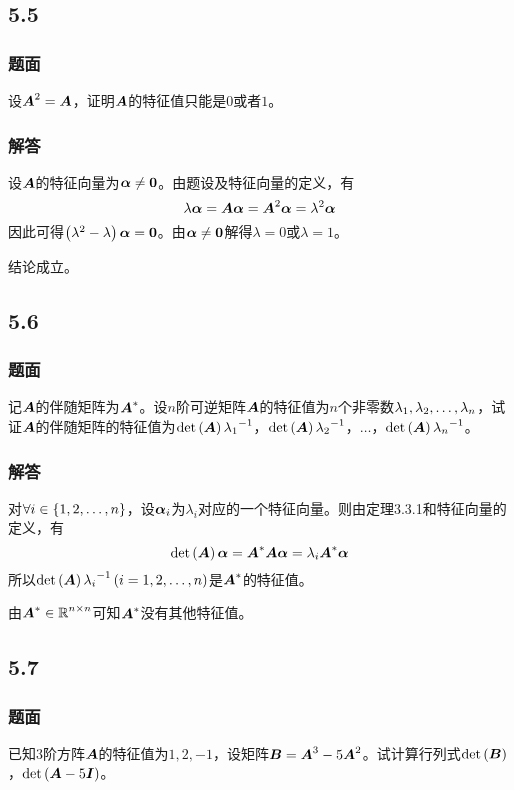 \documentclass[9pt,xcolor=svgnames]{beamer} %
\begin{document}
\subsection*{5.5}
\begin{frame}
    \frametitle{题面}
    设\(\boldsymbol{A}^2=\boldsymbol{A}\)，证明\(\boldsymbol{A}\)的特征值只能是\(0\)或者\(1\)。
\end{frame}

\begin{frame}
    \frametitle{解答}
    设\(\boldsymbol{A}\)的特征向量为\(\boldsymbol{\alpha}\neq\boldsymbol{0}\)。由题设及特征向量的定义，有
    \begin{equation*}
        \lambda\boldsymbol{\alpha}=\boldsymbol{A}\boldsymbol{\alpha}=\boldsymbol{A}^2\boldsymbol{\alpha}=\lambda^2\boldsymbol{\alpha}
    \end{equation*}
    \pause
    因此可得\(\left( \lambda^2-\lambda \right)\boldsymbol{\alpha}=\boldsymbol{0}\)。由\(\boldsymbol{\alpha}\neq\boldsymbol{0}\)解得\(\lambda=0\)或\(\lambda=1\)。

    结论成立。
\end{frame}

\subsection*{5.6}
\begin{frame}
    \frametitle{题面}
    记\(\boldsymbol{A}\)的伴随矩阵为\(\boldsymbol{A}^*\)。设\(n\)阶可逆矩阵\(\boldsymbol{A}\)的特征值为\(n\)个非零数\({\lambda}_1,{\lambda}_2,\dots,{\lambda}_{n}\)，试证\(\boldsymbol{A}\)的伴随矩阵的特征值为\(\mathrm{det}\left( \boldsymbol{A} \right){\lambda_1}^{-1}\)，\(\mathrm{det}\left( \boldsymbol{A} \right){\lambda_2}^{-1}\)，\(\dots\)，\(\mathrm{det}\left( \boldsymbol{A} \right){\lambda_n}^{-1}\)。
\end{frame}

\begin{frame}
    \frametitle{解答}
    对\(\forall i\in\left\{1,2,\dots,n \right\}\)，设\(\boldsymbol{\alpha}_i\)为\(\lambda_i\)对应的一个特征向量。则由定理3.3.1和特征向量的定义，有
    \begin{equation*}
        \mathrm{det}\left( \boldsymbol{A} \right)\boldsymbol{\alpha}=\boldsymbol{A}^*\boldsymbol{A}\boldsymbol{\alpha}=\lambda_i\boldsymbol{A}^*\boldsymbol{\alpha}
    \end{equation*}
    \pause
    所以\(\mathrm{det}\left( \boldsymbol{A} \right){\lambda_i}^{-1}\left( i=1,2,\dots,n \right)\)是\(\boldsymbol{A}^*\)的特征值。

    由\(\boldsymbol{A}^*\in\boldsymbol{\mathbb{R}}^{n\times n}\)可知\(\boldsymbol{A}^*\)没有其他特征值。
\end{frame}

\subsection*{5.7}
\begin{frame}
    \frametitle{题面}
    已知\(3\)阶方阵\(\boldsymbol{A}\)的特征值为\(1,2,-1\)，设矩阵\(\boldsymbol{B}=\boldsymbol{A}^3-5\boldsymbol{A}^2\)。试计算行列式\(\mathrm{det}\left( \boldsymbol{B} \right)\)，\(\mathrm{det}\left( \boldsymbol{A}-5\boldsymbol{I} \right)\)。
\end{frame}
\end{document}
